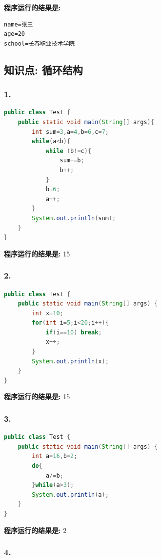 \documentclass[a4paper,12pt]{article}
\begin{document}
\textbf{程序运行的结果是:}
\begin{lstlisting}[style=output]
name=张三
age=20
school=长春职业技术学院
\end{lstlisting}

\subsection{知识点: 循环结构}

\subsubsection{1.}

\begin{lstlisting}[language=Java, caption=嵌套while循环]
public class Test {
    public static void main(String[] args){
        int sum=3,a=4,b=6,c=7;
        while(a<b){
            while (b!=c){
                sum+=b;
                b++;
            }
            b=6;
            a++;
        }
        System.out.println(sum);
    }
}
\end{lstlisting}

\textbf{程序运行的结果是:} 15

\subsubsection{2.}

\begin{lstlisting}[language=Java, caption=for循环与break]
public class Test {
    public static void main(String[] args) {
        int x=10;
        for(int i=5;i<20;i++){
            if(i==10) break;
            x++;
        }
        System.out.println(x);
    }
}
\end{lstlisting}

\textbf{程序运行的结果是:} 15

\subsubsection{3.}

\begin{lstlisting}[language=Java, caption=do-while循环]
public class Test {
    public static void main(String[] args) {
        int a=16,b=2;
        do{
            a/=b;
        }while(a>3);
        System.out.println(a);
    }
}
\end{lstlisting}

\textbf{程序运行的结果是:} 2

\subsubsection{4.}
\end{document}
